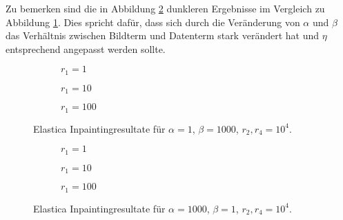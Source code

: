 \documentclass{mythesis}
\begin{document}
Zu bemerken sind die in Abbildung \ref{fig:num_eeparam2_png} dunkleren Ergebnisse im Vergleich zu Abbildung \ref{fig:num_eeparam_png}.
Dies spricht dafür, dass sich durch die Veränderung von $\alpha$ und $\beta$ das Verhältnis zwischen Bildterm und Datenterm stark verändert hat und $\eta$ entsprechend angepasst werden sollte.

\begin{figure}[ht]
    \centering
    \begin{subfigure}{0.25\textwidth}
	\centering
	\caption{$r_1 = 1$}
    \end{subfigure}%
    \begin{subfigure}{0.25\textwidth}
	\centering
	\caption{$r_1 = 10$}
    \end{subfigure}%
    \begin{subfigure}{0.25\textwidth}
	\centering
	\caption{$r_1 = 100$}
    \end{subfigure}%
    \caption{Elastica Inpaintingresultate für $\alpha = 1$, $\beta = 1000$, $r_2, r_4 = 10^4$.}
    \label{fig:num_eeparam_png}
\end{figure}

\begin{figure}[ht]
    \centering
    \begin{subfigure}{0.25\textwidth}
	\centering
	\caption{$r_1 = 1$}
    \end{subfigure}%
    \begin{subfigure}{0.25\textwidth}
	\centering
	\caption{$r_1 = 10$}
    \end{subfigure}%
    \begin{subfigure}{0.25\textwidth}
	\centering
	\caption{$r_1 = 100$}
    \end{subfigure}%
    \caption{Elastica Inpaintingresultate für $\alpha = 1000$, $\beta = 1$, $r_2, r_4 = 10^4$.}
    \label{fig:num_eeparam2_png}
\end{figure}
\end{document}
